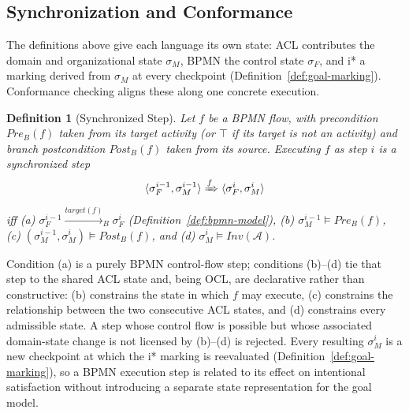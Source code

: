 \documentclass[a4paper, conference]{IEEEtran}
\newtheorem{definition}{Definition}
\begin{document}
\subsection{Synchronization and Conformance}
\label{sec:checking}

The definitions above give each language its own state: ACL contributes the domain and organizational state $\sigma_M$, BPMN the control state $\sigma_F$, and i* a marking derived from $\sigma_M$ at every checkpoint (Definition~\ref{def:goal-marking}). Conformance checking aligns these along one concrete execution.

\begin{definition}[Synchronized Step]
\label{def:synchronized-transition}
Let $f$ be a BPMN flow, with precondition $\mathit{Pre}_B(f)$ taken from its target activity (or $\top$ if its target is not an activity) and branch postcondition $\mathit{Post}_B(f)$ taken from its source. Executing $f$ as step $i$ is a synchronized step
\[
\langle\sigma_F^{i-1},\sigma_M^{i-1}\rangle \xRightarrow{f}\langle\sigma_F^i,\sigma_M^i\rangle
\]
iff (a) $\sigma_F^{i-1}\xrightarrow{\mathit{target}(f)}_B\sigma_F^i$ (Definition~\ref{def:bpmn-model}), (b) $\sigma_M^{i-1}\models\mathit{Pre}_B(f)$, (c) $(\sigma_M^{i-1},\sigma_M^i)\models\mathit{Post}_B(f)$, and (d) $\sigma_M^i\models\mathit{Inv}(\mathcal A)$.
\end{definition}

Condition (a) is a purely BPMN control-flow step; conditions (b)--(d) tie that step to the shared ACL state and, being OCL, are declarative rather than constructive: (b) constrains the state in which $f$ may execute, (c) constrains the relationship between the two consecutive ACL states, and (d) constrains every admissible state. A step whose control flow is possible but whose associated domain-state change is not licensed by (b)--(d) is rejected. Every resulting $\sigma_M^i$ is a new checkpoint at which the i* marking is reevaluated (Definition~\ref{def:goal-marking}), so a BPMN execution step is related to its effect on intentional satisfaction without introducing a separate state representation for the goal model.
\end{document}
